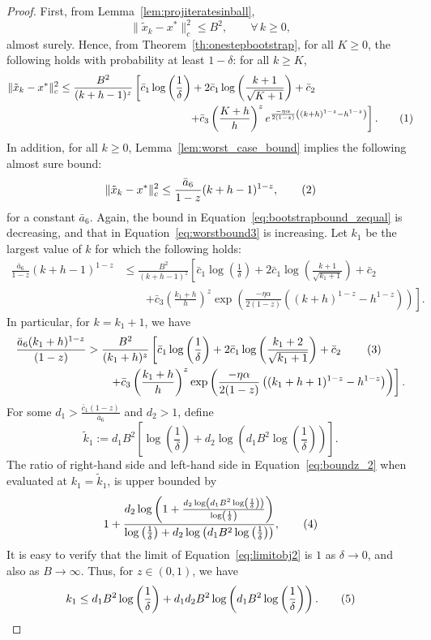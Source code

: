 \documentclass{article}
\newcommand{\numberthis}{\addtocounter{equation}{1}\tag{\theequation}}
\newcommand{\lrp}[1]{\left( #1 \right)}
\newcommand{\lrs}[1]{\left[ #1 \right]}
\begin{document}
\begin{proof}
    First, from  Lemma~\ref{lem:projiteratesinball}, 
    \[ \|\tilde{x}_k - x^*\|^2_c \le B^2, \qquad \forall \, k\ge 0, \] 
almost surely. Hence, from Theorem~\ref{th:onestepbootstrap}, for all $K\ge 0$, the following holds with probability at least $1-\delta$: for all $k\ge K$, 
\begin{align*}
    \|\tilde{x}_k - x^*\|^2_c &\le  \frac{B^2}{(k+h-1)^z} \left[ \bar{c}_1\log\lrp{\frac{1}{\delta}} + 2\bar{c}_1\log\lrp{\frac{k+1}{\sqrt{K+1}}} + \bar{c}_2 \right. \\
    &\qquad\qquad\qquad\qquad\qquad\qquad \left. + \bar{c}_3 \lrp{\frac{K+h}{h}}^z e^{\frac{-\eta \alpha}{2(1-z)}\lrp{(k+h)^{1-z} - h^{1-z}}} \right]. \numberthis\label{eq:bootstrapbound_zequal}
\end{align*}
In addition, for all $k\ge 0$, Lemma~\ref{lem:worst_case_bound} implies the following almost sure bound:
\[ \|\tilde{x}_{k} - x^*\|^2_c \leq \frac{\bar{a}_6}{1-z}{ (k+h-1)^{1-z}}, \numberthis\label{eq:worstbound3} \]
for a constant $\bar{a}_6$. Again, the bound in Equation~\eqref{eq:bootstrapbound_zequal} is decreasing, and that in Equation~\eqref{eq:worstbound3} is increasing. Let $k_1$ be the largest value of $k$ for which the following holds:
\begin{align*}
    \frac{\bar{a}_6}{1-z}(k+h-1)^{1-z} 
    &\leq \frac{B^2}{(k+h-1)^z}\left[ \bar{c}_1\log\lrp{\frac{1}{\delta}} + 2\bar{c}_1\log\lrp{\frac{k+1}{\sqrt{k_1+1}}} + \bar{c}_2  \right.\\
    &\qquad \left. + \bar{c}_3 \lrp{\frac{k_1 + h}{h}}^z \exp\lrp{\frac{-\eta \alpha}{2(1-z)}\lrp{(k+h)^{1-z} - h^{1-z}}} \right].
\end{align*}
In particular, for $k=k_1+1$, we have
\begin{align*}
    \frac{\bar{a}_6 (k_1+h)^{1-z}}{(1-z)}
    &> \frac{B^2}{(k_1 + h)^z}\left[\bar{c}_1\log\lrp{\frac{1}{\delta}} + 2\bar{c}_1\log\lrp{\frac{k_1+2}{\sqrt{k_1+1}}} + \bar{c}_2  \right. \numberthis\label{eq:boundz_2} \\
    &\qquad \left.  + \bar{c}_3 \lrp{\frac{k_1+h}{h}}^z\exp\lrp{\frac{-\eta \alpha}{2(1-z)}\lrp{(k_1+h+1)^{1-z} - h^{1-z}}}\right].
\end{align*}
For some $d_1 > \frac{\bar{c}_1 (1-z)}{\bar{a}_6} $ and $d_2 > 1$, define
\[ \tilde{k}_1 := d_1 B^2 \lrs{ \log\lrp{\frac{1}{\delta}} +  d_2 \log\lrp{ d_1 B^2 \log\lrp{\frac{1}{\delta}} }}.\]
The ratio of right-hand side and left-hand side in Equation~\eqref{eq:boundz_2} when evaluated at $k_1 = \tilde{k}_1$, is upper bounded by 
\begin{align*}
    1 + \frac{ d_2\log\lrp{1 + \frac{d_2\log\left(d_1 B^2 \log\left(\frac{1}{\delta}\right)\right)}{\log\left(\frac{1}{\delta}\right)}} }{\log\left(\frac{1}{\delta}\right) + d_2\log\left(d_1 B^2 \log\left(\frac{1}{\delta}\right)\right)},\numberthis\label{eq:limitobj2}
\end{align*}
It is easy to verify that the limit of Equation~\eqref{eq:limitobj2} is $1$ as $\delta\rightarrow 0$, and also as $B \rightarrow \infty$. Thus, for $z\in(0,1)$, we have
\[k_1 \le d_1 B^2 \log\lrp{\frac{1}{\delta}} + d_1 d_2 B^2 \log\lrp{ d_1 B^2 \log\lrp{\frac{1}{\delta}} }. \numberthis\label{eq:k1_z_equal}\]


\end{proof}
\end{document}
